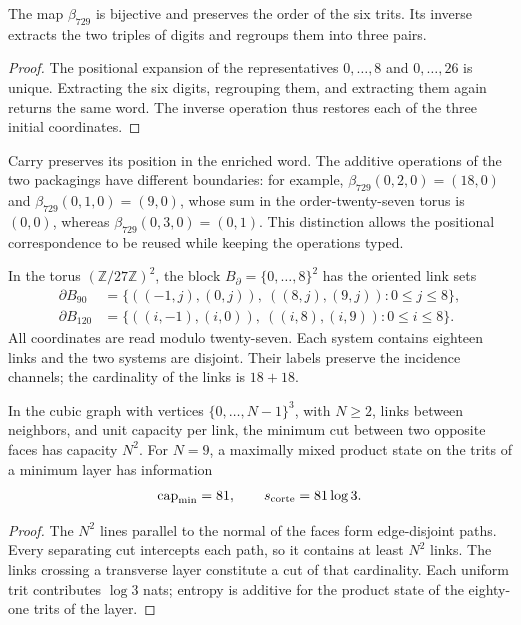 \begin{proposition}
\label{x_reciprocidad:v:ant:prop:ii-area-beta729}
The map \(\beta_{729}\) is bijective and preserves the order of the
six trits. Its inverse extracts the two triples of digits and regroups them
into three pairs.
\end{proposition}
\begin{proof}
The positional expansion of the representatives \(0,\ldots,8\) and
\(0,\ldots,26\) is unique. Extracting the six digits, regrouping them, and
extracting them again returns the same word. The inverse operation
thus restores each of the three initial coordinates.
\end{proof}

Carry preserves its position in the enriched word. The additive
operations of the two packagings have different boundaries: for example,
\(\beta_{729}(0,2,0)=(18,0)\) and
\(\beta_{729}(0,1,0)=(9,0)\), whose sum in the order-twenty-seven
torus is \((0,0)\), whereas
\(\beta_{729}(0,3,0)=(0,1)\). This distinction allows the positional
correspondence to be reused while keeping the operations typed.

In the torus \((\mathbb Z/27\mathbb Z)^2\), the block
\(B_\partial=\{0,\ldots,8\}^2\) has the oriented link sets
\begin{align}
 \partial B_{90}
 &=\{((-1,j),(0,j)),\ ((8,j),(9,j)):0\le j\le8\},\\
 \partial B_{120}
 &=\{((i,-1),(i,0)),\ ((i,8),(i,9)):0\le i\le8\}.
 \label{x_reciprocidad:v:ant:eq:ii-area-enlaces}
\end{align}
All coordinates are read modulo twenty-seven. Each system contains eighteen links and the two systems are disjoint. Their labels preserve the incidence channels; the cardinality of the links is \(18+18\).

\begin{theorem}
\label{x_reciprocidad:v:ant:thm:ii-area-corte-minimo}
In the cubic graph with vertices \(\{0,\ldots,N-1\}^3\), with
\(N\ge2\), links between neighbors, and unit capacity per link,
the minimum cut between two opposite faces has capacity \(N^2\).
For \(N=9\), a maximally mixed product state on the
trits of a minimum layer has information
\begin{equation}
 \operatorname{cap}_{\min}=81,\qquad s_{\rm corte}=81\log3.
 \label{x_reciprocidad:v:ant:eq:ii-area-corte-informacion}
\end{equation}
\end{theorem}
\begin{proof}
The \(N^2\) lines parallel to the normal of the faces form edge-disjoint
paths. Every separating cut intercepts each path, so
it contains at least \(N^2\) links. The links crossing
a transverse layer constitute a cut of that cardinality. Each uniform trit
contributes \(\log3\) nats; entropy is additive for the product
state of the eighty-one trits of the layer.
\end{proof}

